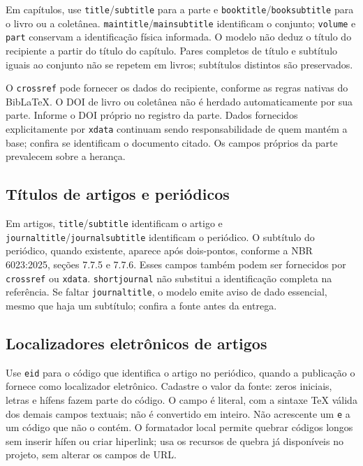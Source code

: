 Em capítulos, use \texttt{title}/\texttt{subtitle} para a parte e
\texttt{booktitle}/\texttt{booksubtitle} para o livro ou a coletânea.
\texttt{maintitle}/\texttt{mainsubtitle} identificam o conjunto;
\texttt{volume} e \texttt{part} conservam a identificação física informada.
O modelo não deduz o título do recipiente a partir do título do capítulo.
Pares completos de título e subtítulo iguais ao conjunto não se repetem
em livros; subtítulos distintos são preservados.

O \texttt{crossref} pode fornecer os dados do recipiente, conforme as
regras nativas do BibLaTeX. O DOI de livro ou coletânea não é herdado
automaticamente por sua parte. Informe o DOI próprio no registro da
parte. Dados fornecidos explicitamente por \texttt{xdata} continuam sendo
responsabilidade de quem mantém a base; confira se identificam o documento
citado. Os campos próprios da parte prevalecem sobre a herança.

\subsection*{Títulos de artigos e periódicos}

Em artigos, \texttt{title}/\texttt{subtitle} identificam o artigo e
\texttt{journaltitle}/\texttt{journalsubtitle} identificam o periódico.
O subtítulo do periódico, quando existente, aparece após dois-pontos,
conforme a NBR 6023:2025, seções 7.7.5 e 7.7.6. Esses campos também podem
ser fornecidos por \texttt{crossref} ou \texttt{xdata}.
\texttt{shortjournal} não substitui a identificação completa na referência.
Se faltar \texttt{journaltitle}, o modelo emite aviso de dado essencial,
mesmo que haja um subtítulo; confira a fonte antes da entrega.

\subsection*{Localizadores eletrônicos de artigos}

Use \texttt{eid} para o código que identifica o artigo no periódico, quando
a publicação o fornece como localizador eletrônico. Cadastre o valor da fonte:
zeros iniciais, letras e hífens fazem parte do código. O campo é literal,
com a sintaxe TeX válida dos demais campos textuais; não é convertido em inteiro.
Não acrescente um \texttt{e} a um código que não o contém. O formatador local
permite quebrar códigos longos sem inserir hífen ou criar hiperlink; usa os
recursos de quebra já disponíveis no projeto, sem alterar os campos de URL.

